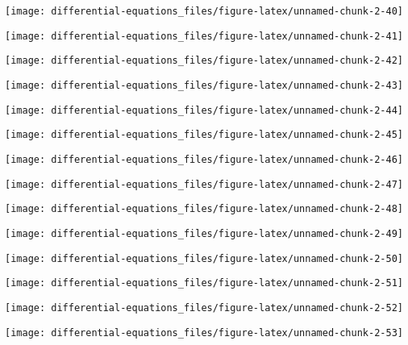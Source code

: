 \documentclass[]{tufte-handout}
\begin{document}
\begin{marginfigure}
\texttt{[image: differential-equations\_files/figure-latex/unnamed-chunk-2-40]} \end{marginfigure}
\begin{marginfigure}
\texttt{[image: differential-equations\_files/figure-latex/unnamed-chunk-2-41]} \end{marginfigure}
\begin{marginfigure}
\texttt{[image: differential-equations\_files/figure-latex/unnamed-chunk-2-42]} \end{marginfigure}
\begin{marginfigure}
\texttt{[image: differential-equations\_files/figure-latex/unnamed-chunk-2-43]} \end{marginfigure}
\begin{marginfigure}
\texttt{[image: differential-equations\_files/figure-latex/unnamed-chunk-2-44]} \end{marginfigure}
\begin{marginfigure}
\texttt{[image: differential-equations\_files/figure-latex/unnamed-chunk-2-45]} \end{marginfigure}
\begin{marginfigure}
\texttt{[image: differential-equations\_files/figure-latex/unnamed-chunk-2-46]} \end{marginfigure}
\begin{marginfigure}
\texttt{[image: differential-equations\_files/figure-latex/unnamed-chunk-2-47]} \end{marginfigure}
\begin{marginfigure}
\texttt{[image: differential-equations\_files/figure-latex/unnamed-chunk-2-48]} \end{marginfigure}
\begin{marginfigure}
\texttt{[image: differential-equations\_files/figure-latex/unnamed-chunk-2-49]} \end{marginfigure}
\begin{marginfigure}
\texttt{[image: differential-equations\_files/figure-latex/unnamed-chunk-2-50]} \end{marginfigure}
\begin{marginfigure}
\texttt{[image: differential-equations\_files/figure-latex/unnamed-chunk-2-51]} \end{marginfigure}
\begin{marginfigure}
\texttt{[image: differential-equations\_files/figure-latex/unnamed-chunk-2-52]} \end{marginfigure}
\begin{marginfigure}
\texttt{[image: differential-equations\_files/figure-latex/unnamed-chunk-2-53]} \end{marginfigure}
\end{document}
